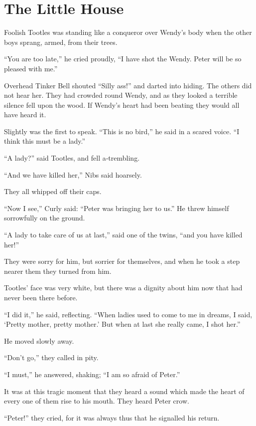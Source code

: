 
\chapter{The Little House}

Foolish Tootles was standing like a conqueror over Wendy’s body
when the other boys sprang, armed, from their trees.

“You are too late,” he cried proudly, “I have shot the Wendy.
Peter will be so pleased with me.”

Overhead Tinker Bell shouted “Silly ass!\@” and darted into hiding.
The others did not hear her.
They had crowded round Wendy, and as they looked a terrible silence fell upon the wood.
If Wendy’s heart had been beating they would all have heard it.

Slightly was the first to speak.
“This is no bird,” he said in a scared voice.
“I think this must be a lady.”

“A lady?\@” said Tootles, and fell a‐trembling.

“And we have killed her,” Nibs said hoarsely.

They all whipped off their caps.

“Now I see,” Curly said:
“Peter was bringing her to us.”
He threw himself sorrowfully on the ground.

“A lady to take care of us at last,” said one of the twins,
“and you have killed her!”

They were sorry for him, but sorrier for themselves,
and when he took a step nearer them they turned from him.

Tootles’ face was very white, but there was a dignity about him now that had never been there before.

“I did it,” he said, reflecting.
“When ladies used to come to me in dreams,
I said, ‘Pretty mother, pretty mother.’
But when at last she really came, I shot her.”

He moved slowly away.

“Don’t go,” they called in pity.

“I must,” he answered, shaking;
“I am so afraid of Peter.”

It was at this tragic moment that they heard a sound which made the heart of every one of them rise to his mouth.
They heard Peter crow.

“Peter!\@” they cried, for it was always thus that he signalled his return.

